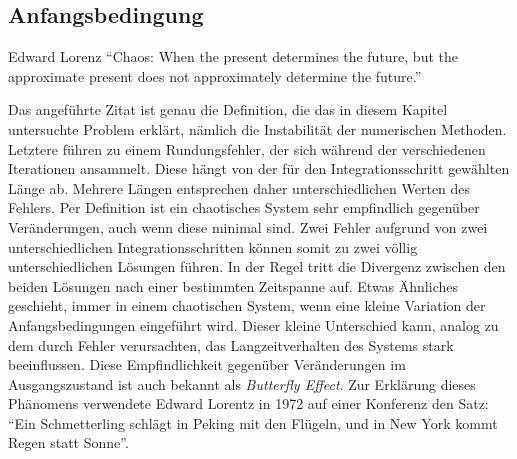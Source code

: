 \subsection{Anfangsbedingung}
\label{vanderpol:subsection:anfangsbedingung}
\begin{cquote}[30pt]{Edward Lorenz}
``Chaos: When the present determines the future, but the approximate present does not approximately determine the future.''\cite{vanderpol:biblorenz}
\end{cquote}
\noindent Das angeführte Zitat ist genau die Definition, die das in diesem Kapitel untersuchte Problem erklärt, nämlich die Instabilität der numerischen Methoden. Letztere führen zu einem Rundungsfehler, der sich während der verschiedenen Iterationen ansammelt. Diese hängt von der für den Integrationsschritt gewählten Länge ab. Mehrere Längen entsprechen daher unterschiedlichen Werten des Fehlers.
Per Definition ist ein chaotisches System sehr empfindlich gegenüber Veränderungen, auch wenn diese minimal sind. Zwei Fehler aufgrund von zwei unterschiedlichen Integrationsschritten können somit zu zwei völlig unterschiedlichen Lösungen führen. In der Regel tritt die Divergenz zwischen den beiden Lösungen nach einer bestimmten Zeitspanne auf. Etwas Ähnliches geschieht, immer in einem chaotischen System, wenn eine kleine Variation der Anfangsbedingungen eingeführt wird. Dieser kleine Unterschied kann, analog zu dem durch Fehler verursachten, das Langzeitverhalten des Systems stark beeinflussen. Diese Empfindlichkeit gegenüber Veränderungen im Ausgangszustand ist auch bekannt als {\em Butterfly Effect}. Zur Erklärung dieses Phänomens verwendete Edward Lorentz in 1972 auf einer Konferenz den Satz: ``Ein Schmetterling schlägt in Peking mit den Flügeln, und in New York kommt Regen statt Sonne''.
